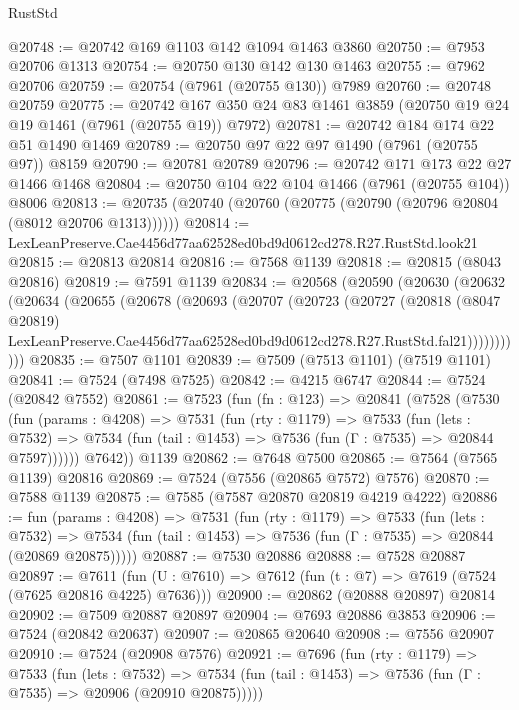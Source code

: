 \begin{lexlean}{RustStd}
\begin{coremodule}
@20748 := @20742 @169 @1103 @142 @1094 @1463 @3860
@20750 := @7953 @20706 @1313
@20754 := @20750 @130 @142 @130 @1463
@20755 := @7962 @20706
@20759 := @20754 (@7961 (@20755 @130)) @7989
@20760 := @20748 @20759
@20775 := @20742 @167 @350 @24 @83 @1461 @3859 (@20750 @19 @24 @19 @1461 (@7961 (@20755 @19)) @7972)
@20781 := @20742 @184 @174 @22 @51 @1490 @1469
@20789 := @20750 @97 @22 @97 @1490 (@7961 (@20755 @97)) @8159
@20790 := @20781 @20789
@20796 := @20742 @171 @173 @22 @27 @1466 @1468
@20804 := @20750 @104 @22 @104 @1466 (@7961 (@20755 @104)) @8006
@20813 := @20735 (@20740 (@20760 (@20775 (@20790 (@20796 @20804 (@8012 @20706 @1313))))))
@20814 := LexLeanPreserve.Cae4456d77aa62528ed0bd9d0612cd278.R27.RustStd.look21
@20815 := @20813 @20814
@20816 := @7568 @1139
@20818 := @20815 (@8043 @20816)
@20819 := @7591 @1139
@20834 := @20568
    (@20590
      (@20630
        (@20632
          (@20634
            (@20655
              (@20678
                (@20693
                  (@20707
                    (@20723
                      (@20727
                        (@20818
                          (@8047 @20819)
                          LexLeanPreserve.Cae4456d77aa62528ed0bd9d0612cd278.R27.RustStd.fal21)))))))))))
@20835 := @7507 @1101
@20839 := @7509 (@7513 @1101) (@7519 @1101)
@20841 := @7524 (@7498 @7525)
@20842 := @4215 @6747
@20844 := @7524 (@20842 @7552)
@20861 := @7523
    (fun (fn : @123) =>
    @20841
      (@7528
        (@7530
          (fun (params : @4208) =>
          @7531
            (fun (rty : @1179) =>
            @7533
              (fun (lets : @7532) =>
              @7534 (fun (tail : @1453) => @7536 (fun (Γ : @7535) => @20844 @7597))))))
        @7642))
    @1139
@20862 := @7648 @7500
@20865 := @7564 (@7565 @1139) @20816
@20869 := @7524 (@7556 (@20865 @7572) @7576)
@20870 := @7588 @1139
@20875 := @7585 (@7587 @20870 @20819 @4219 @4222)
@20886 := fun (params : @4208) =>
  @7531
    (fun (rty : @1179) =>
    @7533
      (fun (lets : @7532) =>
      @7534 (fun (tail : @1453) => @7536 (fun (Γ : @7535) => @20844 (@20869 @20875)))))
@20887 := @7530 @20886
@20888 := @7528 @20887
@20897 := @7611
    (fun (U : @7610) => @7612 (fun (t : @7) => @7619 (@7524 (@7625 @20816 @4225) @7636)))
@20900 := @20862 (@20888 @20897) @20814
@20902 := @7509 @20887 @20897
@20904 := @7693 @20886 @3853
@20906 := @7524 (@20842 @20637)
@20907 := @20865 @20640
@20908 := @7556 @20907
@20910 := @7524 (@20908 @7576)
@20921 := @7696
    (fun (rty : @1179) =>
    @7533
      (fun (lets : @7532) =>
      @7534 (fun (tail : @1453) => @7536 (fun (Γ : @7535) => @20906 (@20910 @20875)))))

\end{coremodule}
\end{lexlean}
